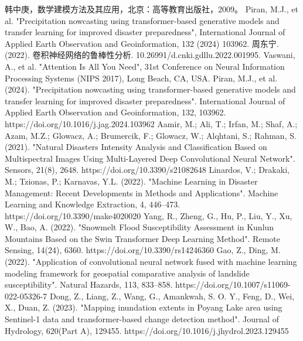\documentclass[withoutpreface,bwprint]{cumcmthesis} %
\begin{document}
\newpage
%
%
\begin{thebibliography}{99}%
	 韩中庚，数学建模方法及其应用，北京：高等教育出版社，2009。 
	 Piran, M.J., et al. "Precipitation nowcasting using transformer-based generative models and transfer learning for improved disaster preparedness", International Journal of Applied Earth Observation and Geoinformation, 132 (2024) 103962. 
	周东宁. (2022). 卷积神经网络的鲁棒性分析. 10.26991/d.cnki.gdllu.2022.001995.
	Vaswani, A., et al. "Attention Is All You Need", 31st Conference on Neural Information Processing Systems (NIPS 2017), Long Beach, CA, USA.
	Piran, M.J., et al. (2024). "Precipitation nowcasting using transformer-based generative models and transfer learning for improved disaster preparedness". International Journal of Applied Earth Observation and Geoinformation, 132, 103962. https://doi.org/10.1016/j.jag.2024.103962
	Aamir, M.; Ali, T.; Irfan, M.; Shaf, A.; Azam, M.Z.; Glowacz, A.; Brumercik, F.; Glowacz, W.; Alqhtani, S.; Rahman, S. (2021). "Natural Disasters Intensity Analysis and Classification Based on Multispectral Images Using Multi-Layered Deep Convolutional Neural Network". Sensors, 21(8), 2648. https://doi.org/10.3390/s21082648
	Linardos, V.; Drakaki, M.; Tzionas, P.; Karnavas, Y.L. (2022). "Machine Learning in Disaster Management: Recent Developments in Methods and Applications". Machine Learning and Knowledge Extraction, 4, 446–473. https://doi.org/10.3390/make4020020
Yang, R., Zheng, G., Hu, P., Liu, Y., Xu, W.,  Bao, A. (2022). "Snowmelt Flood Susceptibility Assessment in Kunlun Mountains Based on the Swin Transformer Deep Learning Method". Remote Sensing, 14(24), 6360. https://doi.org/10.3390/rs14246360
 Gao, Z.,  Ding, M. (2022). "Application of convolutional neural network fused with machine learning modeling framework for geospatial comparative analysis of landslide susceptibility". Natural Hazards, 113, 833–858. https://doi.org/10.1007/s11069-022-05326-7
Dong, Z., Liang, Z., Wang, G., Amankwah, S. O. Y., Feng, D., Wei, X.,  Duan, Z. (2023). "Mapping inundation extents in Poyang Lake area using Sentinel-1 data and transformer-based change detection method". Journal of Hydrology, 620(Part A), 129455. https://doi.org/10.1016/j.jhydrol.2023.129455
	
\end{thebibliography}
\end{document}
